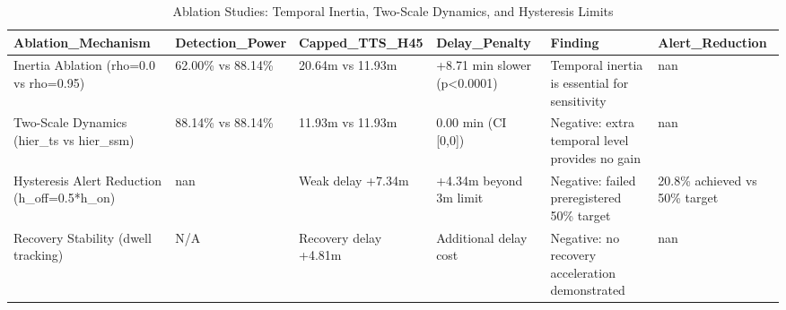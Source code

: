 \begin{table}[htbp]
\centering
\caption{Ablation Studies: Temporal Inertia, Two-Scale Dynamics, and Hysteresis Limits}
\label{tab:table_T7_inertia_hysteresis_ablations}
\begin{tabular}{llllll}
\hline
Ablation\_Mechanism & Detection\_Power & Capped\_TTS\_H45 & Delay\_Penalty & Finding & Alert\_Reduction \\
\hline
Inertia Ablation (rho=0.0 vs rho=0.95) & 62.00\% vs 88.14\% & 20.64m vs 11.93m & +8.71 min slower (p<0.0001) & Temporal inertia is essential for sensitivity & nan \\
Two-Scale Dynamics (hier\_ts vs hier\_ssm) & 88.14\% vs 88.14\% & 11.93m vs 11.93m & 0.00 min (CI [0,0]) & Negative: extra temporal level provides no gain & nan \\
Hysteresis Alert Reduction (h\_off=0.5*h\_on) & nan & Weak delay +7.34m & +4.34m beyond 3m limit & Negative: failed preregistered 50\% target & 20.8\% achieved vs 50\% target \\
Recovery Stability (dwell tracking) & N/A & Recovery delay +4.81m & Additional delay cost & Negative: no recovery acceleration demonstrated & nan \\
\hline
\end{tabular}
\end{table}
